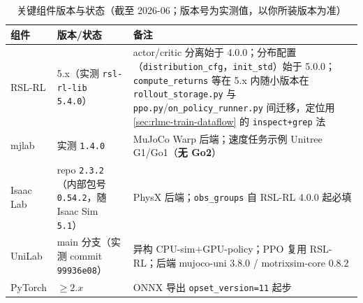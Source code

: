 \begin{table}[H]
\centering
\caption{关键组件版本与状态（截至 2026-06；版本号为实测值，以你所装版本为准）}
\label{tab:rlmc-train-versioninfo-tab}
\begin{tabular}{lll}
\hline
组件 & 版本/状态 & 备注 \\
\hline
RSL-RL & 5.x（实测 \verb|rsl-rl-lib 5.4.0|） & actor/critic 分离始于 4.0.0；分布配置（\verb|distribution_cfg|，\verb|init_std|）始于 5.0.0；\verb|compute_returns| 等在 5.x 内随小版本在 \verb|rollout_storage.py| 与 \verb|ppo.py|/\verb|on_policy_runner.py| 间迁移，定位用 \cref{sec:rlmc-train-dataflow} 的 \texttt{inspect+grep} 法 \cite{schwarke2025rslrl} \\
mjlab & 实测 \verb|1.4.0| & MuJoCo Warp 后端；速度任务示例 Unitree G1/Go1（\textbf{无 Go2}） \\
Isaac Lab & repo \verb|2.3.2|（内部包号 \verb|0.54.2|，随 Isaac Sim \verb|5.1|） & PhysX 后端；\verb|obs_groups| 自 RSL-RL 4.0.0 起必填 \\
UniLab & main 分支（实测 commit \texttt{99936e08}） & 异构 CPU-sim$+$GPU-policy；PPO 复用 RSL-RL；后端 mujoco-uni $3.8.0$ / motrixsim-core $0.8.2$ \\
PyTorch & $\ge 2.x$ & ONNX 导出 \verb|opset_version=11| 起步 \\
\hline
\end{tabular}
\end{table}
